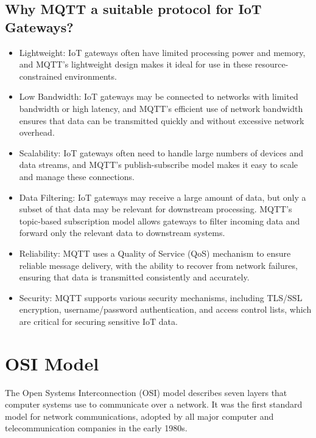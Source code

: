 \documentclass[12pt]{article}
\begin{document}
\subsection*{Why MQTT a suitable protocol for IoT Gateways?}
\begin{itemize}

\item Lightweight: IoT gateways often have limited processing power and memory, and MQTT's lightweight design makes it ideal for use in these resource-constrained environments.

\item Low Bandwidth: IoT gateways may be connected to networks with limited bandwidth or high latency, and MQTT's efficient use of network bandwidth ensures that data can be transmitted quickly and without excessive network overhead.

\item Scalability: IoT gateways often need to handle large numbers of devices and data streams, and MQTT's publish-subscribe model makes it easy to scale and manage these connections.

\item Data Filtering: IoT gateways may receive a large amount of data, but only a subset of that data may be relevant for downstream processing. MQTT's topic-based subscription model allows gateways to filter incoming data and forward only the relevant data to downstream systems.

\item Reliability: MQTT uses a Quality of Service (QoS) mechanism to ensure reliable message delivery, with the ability to recover from network failures, ensuring that data is transmitted consistently and accurately.

\item Security: MQTT supports various security mechanisms, including TLS/SSL encryption, username/password authentication, and access control lists, which are critical for securing sensitive IoT data.

\end{itemize}
\section{OSI Model}
The Open Systems Interconnection (OSI) model describes seven layers that computer systems use to communicate over a network. It was the first standard model for network communications, adopted by all major computer and telecommunication companies in the early 1980s.
\end{document}

